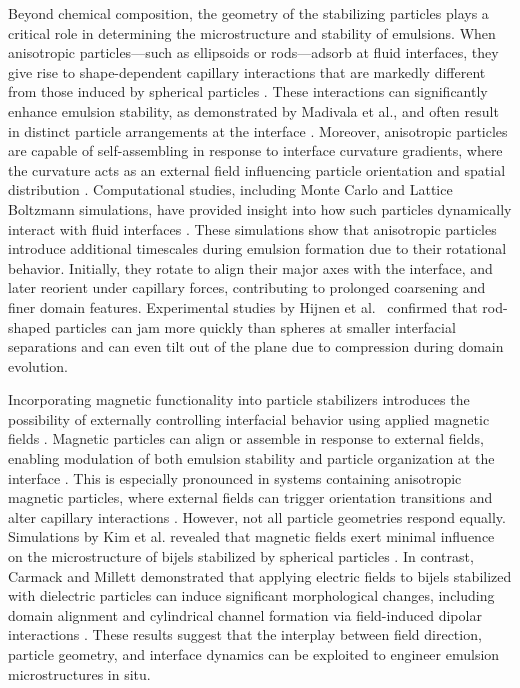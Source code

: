 Beyond chemical composition, the geometry of the stabilizing particles plays a critical role in determining 
the microstructure and stability of emulsions. When anisotropic particles—such as ellipsoids or rods—adsorb at 
fluid interfaces, they give rise to shape-dependent capillary interactions that are markedly different from those 
induced by spherical particles \cite{loudet_capillary_2005,madivala_exploiting_2009}. These interactions can 
significantly enhance emulsion stability, as demonstrated by Madivala et al., and often result in distinct particle 
arrangements at the interface \cite{madivala_self-assembly_2009}. Moreover, anisotropic particles are capable of 
self-assembling in response to interface curvature gradients, where the curvature acts as an external field influencing 
particle orientation and spatial distribution \cite{cavallaro_curvature-driven_2011, furst_directing_2011}. Computational 
studies, including Monte Carlo and Lattice Boltzmann simulations, have provided insight into how such particles dynamically 
interact with fluid interfaces \cite{bresme_orientational_2007, bresme_computer_2008, gunther_lattice_2013,gunther_timescales_2014}. 
These simulations show that anisotropic particles introduce additional timescales during 
emulsion formation due to their rotational behavior. Initially, they rotate to align their major axes with the interface, 
and later reorient under capillary forces, contributing to prolonged coarsening and finer domain features. Experimental studies 
by Hijnen et al.~\cite{hijnen_bijels_2015} confirmed that rod-shaped particles can jam more quickly than spheres at smaller 
interfacial separations and can even tilt out of the plane due to compression during domain evolution.

Incorporating magnetic functionality into particle stabilizers introduces the possibility of externally controlling interfacial 
behavior using applied magnetic fields \cite{melle_pickering_2005, zhou_magnetic_2011}. Magnetic particles can align or assemble 
in response to external fields, enabling modulation of both emulsion stability and particle organization at the interface 
\cite{dassanayake_structure_2000, leunissen_directing_2009}. This is especially pronounced in systems containing anisotropic magnetic 
particles, where external fields can trigger orientation transitions and alter capillary interactions \cite{morgan_understanding_2012, 
davies_interface_2014, davies_dipolar_2015}. However, not all particle geometries respond equally. Simulations by Kim et al. revealed 
that magnetic fields exert minimal influence on the microstructure of bijels stabilized by spherical particles \cite{kim_bijels_2010}. 
In contrast, Carmack and Millett demonstrated that applying electric fields to bijels stabilized with dielectric particles can induce 
significant morphological changes, including domain alignment and cylindrical channel formation via field-induced dipolar interactions 
\cite{carmack_tuning_2018}. These results suggest that the interplay between field direction, particle geometry, and interface dynamics 
can be exploited to engineer emulsion microstructures in situ.

